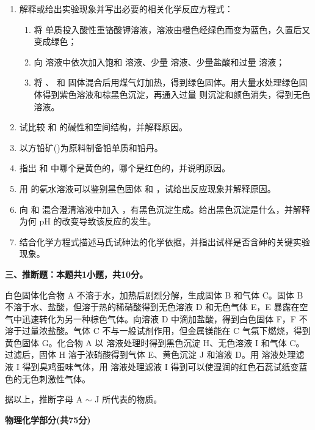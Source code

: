 \begin{enumerate}[label=\arabic*., itemsep=1.5ex]
    \item 解释或给出实验现象并写出必要的相关化学反应方程式：
    \begin{enumerate}[label=(\arabic*), noitemsep, topsep=0pt, partopsep=0pt]
        \item 将  单质投入酸性重铬酸钾溶液，溶液由橙色经绿色而变为蓝色，久置后又变成绿色；
        \item 向  溶液中依次加入饱和  溶液、少量  溶液、少量盐酸和过量  溶液；
        \item 将 、 和  固体混合后用煤气灯加热，得到绿色固体。用大量水处理绿色固体得到紫色溶液和棕黑色沉淀，再通入过量  则沉淀和颜色消失，得到无色溶液。
    \end{enumerate}

    \item 试比较  和  的碱性和空间结构，并解释原因。

    \item 以方铅矿()为原料制备铅单质和铅丹。

    \item 指出  和  中哪个是黄色的，哪个是红色的，并说明原因。

    \item 用  的氨水溶液可以鉴别黑色固体  和 ，试给出反应现象并解释原因。

    \item 向  和  混合澄清溶液中加入 ，有黑色沉淀生成。给出黑色沉淀是什么，并解释为何 $\text{pH}$ 的改变导致该反应的发生。

    \item 结合化学方程式描述马氏试砷法的化学依据，并指出试样是否含砷的关键实验现象。
\end{enumerate}

\vspace{0.5cm}
\noindent\textbf{三、推断题：本题共1小题，共10分。}

白色固体化合物 A 不溶于水，加热后剧烈分解，生成固体 B 和气体 C。固体 B 不溶于水、盐酸，但溶于热的稀硝酸得到无色溶液 D 和无色气体 E，E 暴露在空气中迅速转化为另一种棕色气体。向溶液 D 中滴加盐酸，得到白色固体 F，F 不溶于过量浓盐酸。气体 C 不与一般试剂作用，但金属镁能在 C 气氛下燃烧，得到黄色固体 G。化合物 A 以  溶液处理时得到黑色沉淀 H、无色溶液 I 和气体 C。过滤后，固体 H 溶于浓硝酸得到气体 E、黄色沉淀 J 和溶液 D。用  溶液处理滤液 I 得到臭鸡蛋味气体，用  溶液处理滤液 I 得到可以使湿润的红色石蕊试纸变蓝色的无色刺激性气体。

据以上，推断字母 A $\sim$ J 所代表的物质。

\vspace{1cm}
\begin{center}
    {\Large \textbf{物理化学部分(共75分)}}
\end{center}